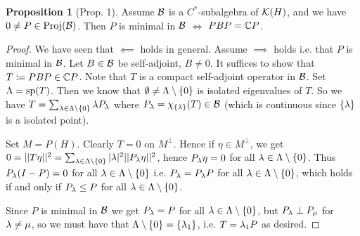 \documentclass[10pt,english,a4paper]{article}
\theoremstyle{definition}
\newtheorem*{proposition}{Proposition}
\DeclareMathOperator{\Proj}{Proj}
\DeclareMathOperator{\Sp}{sp}
\begin{document}
\begin{proposition}[Prop. 1]
    Assume $\mathcal{B}$ is a $C^*$-subalgebra of $\mathcal{K}(H)$, and we have $0\neq P\in \Proj(\Bs)$.
Then $P$ is minimal in $\mathcal{B}$ $\iff$ $PBP = \mathbb{C} P$.
\end{proposition}
\begin{proof}
    We have seen that $\impliedby$ holds in general. 
Assume $\implies$ holds i.e. that $P$ is minimal in $\mathcal{B}$.
Let $B\in \mathcal{B}$ be self-adjoint, $B\neq 0$. It suffices to show that $T\coloneqq PBP \in \mathbb{C} P$.
Note that $T$ is a compact self-adjoint operator in $\mathcal{B}$. Set $\La = \Sp(T)$.
Then we know that $\emptyset \neq \Lambda \setminus \{0\}$ is isolated eigenvalues
of $T$. So we have $T = \sum_{\lambda \in \Lambda\setminus\{0\}} \lambda P_{\lambda}$ where
$P_{\lambda} = \chi_{\{\lambda\}}(T) \in \mathcal{B}$ (which is continuous since $\{\lambda\}$ is
a isolated point). 

Set $M = P(H)$. Clearly $T = 0$ on $M^{\perp}$. Hence if $\eta \in M^{\perp}$, 
we get $0 = ||T\eta||^2 = \sum_{\lambda \in \Lambda\setminus\{0\}} |\lambda|^2 ||P_{\lambda}\eta||^2$,
hence $P_{\lambda}\eta = 0$ for all $\lambda \in \Lambda\setminus\{0\}$. 
Thus $P_{\lambda} (I-P)= 0 $ for all $\lambda \in \Lambda\setminus\{0\}$
i.e. $P_{\lambda} = P_{\lambda}P$ for all $\lambda \in \Lambda\setminus\{0\}$,
which holds if and only if $P_{\lambda}\leq P$ for all $\lambda \in \Lambda\setminus\{0\}$.

Since $P$ is minimal in $\mathcal{B}$ we get $P_{\lambda} = P$ for all $\lambda \in \Lambda\setminus\{0\}$,
but $P_{\lambda}\perp P_{\mu}$ for $\lambda \neq \mu$, so we must have that $\Lambda
\setminus \{0\} = \{\lambda_1\}$, i.e. $T = \lambda_1 P$ as desired. 
\end{proof}
\end{document}
